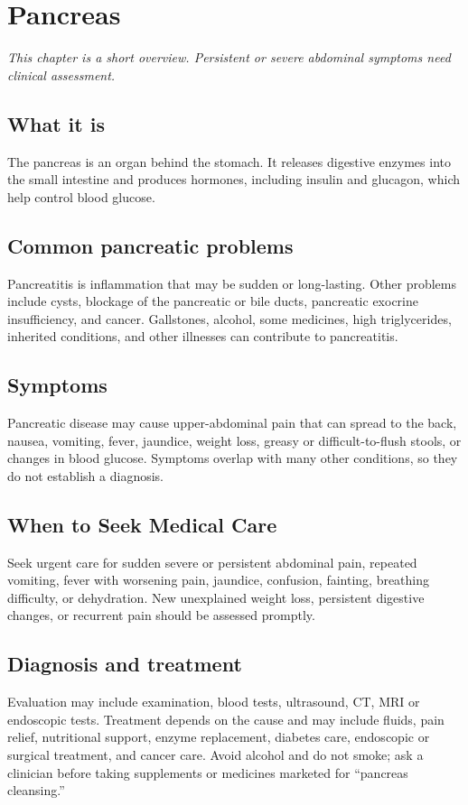 \chapter{Pancreas}

\medskip
\noindent\textit{This chapter is a short overview. Persistent or severe abdominal symptoms need clinical assessment.}

\section*{What it is}
The pancreas is an organ behind the stomach. It releases digestive enzymes into the small intestine and produces hormones, including insulin and glucagon, which help control blood glucose.

\section*{Common pancreatic problems}
Pancreatitis is inflammation that may be sudden or long-lasting. Other problems include cysts, blockage of the pancreatic or bile ducts, pancreatic exocrine insufficiency, and cancer. Gallstones, alcohol, some medicines, high triglycerides, inherited conditions, and other illnesses can contribute to pancreatitis.

\section*{Symptoms}
Pancreatic disease may cause upper-abdominal pain that can spread to the back, nausea, vomiting, fever, jaundice, weight loss, greasy or difficult-to-flush stools, or changes in blood glucose. Symptoms overlap with many other conditions, so they do not establish a diagnosis.

\section*{When to Seek Medical Care}
Seek urgent care for sudden severe or persistent abdominal pain, repeated vomiting, fever with worsening pain, jaundice, confusion, fainting, breathing difficulty, or dehydration. New unexplained weight loss, persistent digestive changes, or recurrent pain should be assessed promptly.

\section*{Diagnosis and treatment}
Evaluation may include examination, blood tests, ultrasound, CT, MRI or endoscopic tests. Treatment depends on the cause and may include fluids, pain relief, nutritional support, enzyme replacement, diabetes care, endoscopic or surgical treatment, and cancer care. Avoid alcohol and do not smoke; ask a clinician before taking supplements or medicines marketed for “pancreas cleansing.”

